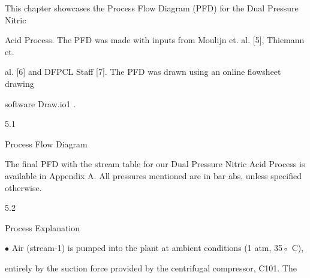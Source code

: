 \documentclass[a4paper,portrait,12pt]{article}
\begin{document}
\begin{flushleft}
This chapter showcases the Process Flow Diagram (PFD) for the Dual Pressure Nitric
\end{flushleft}


\begin{flushleft}
Acid Process. The PFD was made with inputs from Moulijn et. al. [5], Thiemann et.
\end{flushleft}


\begin{flushleft}
al. [6] and DFPCL Staff [7]. The PFD was drawn using an online flowsheet drawing
\end{flushleft}


\begin{flushleft}
software Draw.io1 .
\end{flushleft}





5.1





\begin{flushleft}
Process Flow Diagram
\end{flushleft}





\begin{flushleft}
The final PFD with the stream table for our Dual Pressure Nitric Acid Process is available in Appendix A. All pressures mentioned are in bar abs, unless specified otherwise.
\end{flushleft}





5.2





\begin{flushleft}
Process Explanation
\end{flushleft}





\begin{flushleft}
$\bullet$ Air (stream-1) is pumped into the plant at ambient conditions (1 atm, 35◦ C),
\end{flushleft}


\begin{flushleft}
entirely by the suction force provided by the centrifugal compressor, C101. The
\end{flushleft}
\end{document}
